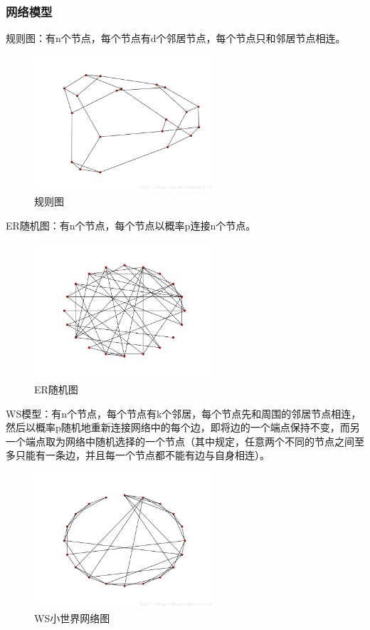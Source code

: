 \documentclass[12pt]{report}
\begin{document}
			\subsubsection{网络模型}
				
				规则图：有n个节点，每个节点有d个邻居节点，每个节点只和邻居节点相连。
				
				\begin{figure}
					\centering
					\includegraphics[width=0.6\textwidth]{img/regular.png}
					\caption{规则图} 
					\label{img}
				\end{figure}
				
				ER随机图：有n个节点，每个节点以概率p连接n个节点。
				
				\begin{figure}
					\centering
					\includegraphics[width=0.6\textwidth]{img/ER.png}
					\caption{ER随机图} 
					\label{img}
				\end{figure}
				
				WS模型：有n个节点，每个节点有k个邻居，每个节点先和周围的邻居节点相连，然后以概率p随机地重新连接网络中的每个边，即将边的一个端点保持不变，而另一个端点取为网络中随机选择的一个节点（其中规定，任意两个不同的节点之间至多只能有一条边，并且每一个节点都不能有边与自身相连）。
				
				\begin{figure}
					\centering
					\includegraphics[width=0.6\textwidth]{img/WS.png}
					\caption{WS小世界网络图} 
					\label{img}
				\end{figure}
				
\end{document}
